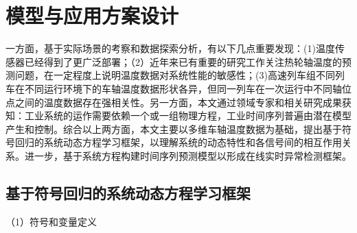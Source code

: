 \section{模型与应用方案设计}

一方面，基于实际场景的考察和数据探索分析，有以下几点重要发现：(1)温度传感器已经得到了更广泛部署；（2）近年来已有重要的研究工作关注热轮轴温度的预测问题\cite{ma2016prediction,yi2015faults,amini2016wayside}，在一定程度上说明温度数据对系统性能的敏感性；(3)高速列车组不同列车在不同运行环境下的车轴温度数据形状各异，但同一列车在一次运行中不同轴位点之间的温度数据存在强相关性。另一方面，本文通过领域专家和相关研究成果获知：工业系统的运作需要依赖一个或一组物理方程，工业时间序列普遍由潜在模型产生和控制\cite{bongard2007automated}。综合以上两方面，本文主要以多维车轴温度数据为基础，提出基于符号回归的系统动态方程学习框架，以理解系统的动态特性和各信号间的相互作用关系。进一步，基于系统方程构建时间序列预测模型以形成在线实时异常检测框架。

\label{sec:sr-model}
\subsection{基于符号回归的系统动态方程学习框架}

（1）符号和变量定义

